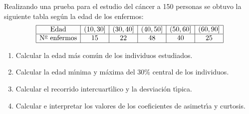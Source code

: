 \documentclass[hidequestions]{homework}
\begin{document}
	\problem
	Realizando una prueba para el estudio del  c{\'a}ncer  a  150  personas  se
	obtuvo la siguiente tabla seg{\'u}n la edad de los enfermos:
	$$
	\begin{array}{|c|c|c|c|c|c|} \hline
	\mbox{Edad}        & (10,30] & (30,40] & (40,50] & (50,60] & (60,90] \\ \hline
	\mbox{N${}^{\underline{o}}$ enfermos} &   15  &   22  &   48  &   40  &  25   \\ \hline
	\end{array}
	$$
	\begin{enumerate}
		\item Calcular la edad m{\'a}s com{\'u}n de los individuos estudiados.
		\item Calcular la edad m{\'\i}nima y m{\'a}xima del 30\% central de los individuos.
		\item Calcular el recorrido intercuart{\'\i}lico y la desviaci{\'o}n t{\'\i}pica.
		\item Calcular e interpretar los valores de los coeficientes de asimetr{\'\i}a y curtosis. \\
	\end{enumerate}
	
	\color{black}
	
	
\end{document}
